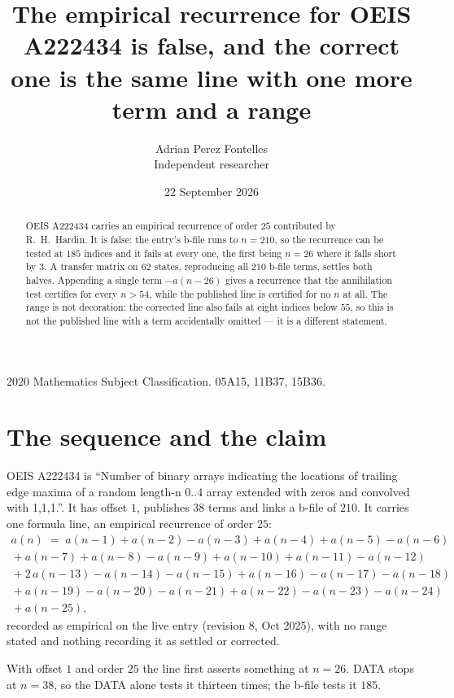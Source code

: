 \documentclass[11pt,a4paper]{article}
\title{The empirical recurrence for OEIS A222434 is false, and the correct one is the same
line with one more term and a range}
\author{Adrian Perez Fontelles\\ \small Independent researcher}
\date{22 September 2026}
\theoremstyle{plain}
\theoremstyle{definition}
\begin{document}
\maketitle

\begin{abstract}
OEIS A222434 carries an empirical recurrence of order $25$ contributed by R.~H.~Hardin. It is
false: the entry's b-file runs to $n=210$, so the recurrence can be tested at $185$ indices and
it fails at every one, the first being $n=26$ where it falls short by $3$. A transfer matrix on
$62$ states, reproducing all $210$ b-file terms, settles both halves. Appending a single term
$-a(n-26)$ gives a recurrence that the annihilation test certifies for every $n>54$, while the
published line is certified for no $n$ at all. The range is not decoration: the corrected line
also fails at eight indices below $55$, so this is not the published line with a term
accidentally omitted --- it is a different statement.
\end{abstract}

\noindent\small 2020 Mathematics Subject Classification. 05A15, 11B37, 15B36.\normalsize

\section{The sequence and the claim}

OEIS A222434 is ``Number of binary arrays indicating the locations of trailing edge maxima of a
random length-n 0..4 array extended with zeros and convolved with 1,1,1.''. It has offset $1$,
publishes $38$ terms and links a b-file of $210$. It carries one formula line, an empirical
recurrence of order $25$:
\begin{multline}\label{eq:conj}
a(n)\;=\;a(n-1) + a(n-2) - a(n-3) + a(n-4) + a(n-5) - a(n-6)\\
{}+ a(n-7) + a(n-8) - a(n-9) + a(n-10) + a(n-11) - a(n-12)\\
{}+ 2\,a(n-13) - a(n-14) - a(n-15) + a(n-16) - a(n-17) - a(n-18)\\
{}+ a(n-19) - a(n-20) - a(n-21) + a(n-22) - a(n-23) - a(n-24)\\
{}+ a(n-25),
\end{multline}
recorded as empirical on the live entry (revision $8$, Oct 2025), with no range stated and
nothing recording it as settled or corrected.

With offset $1$ and order $25$ the line first asserts something at $n=26$. DATA stops at
$n=38$, so the DATA alone tests it thirteen times; the b-file tests it $185$.
\end{document}
